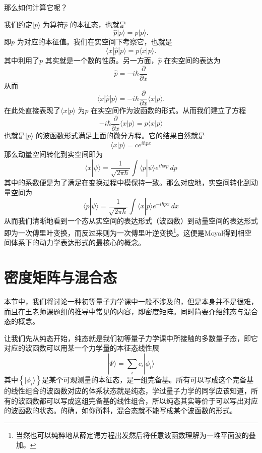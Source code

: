 \documentclass[12pt,a4paper,openany,twoside]{book}
\numberwithin{equation}{section}
\begin{document}
  那么如何计算它呢？

我们约定$| p \rangle $ 为算符$\hat{p}$ 的本征态，也就是
\[
\hat{p} | p \rangle = p | p \rangle 
.\] 
即$p$ 为对应的本征值。我们在实空间下考察它，也就是
\[
\langle x | \hat{p} | p \rangle = p \langle x | p \rangle 
.\] 
其中利用了$p$ 其实就是一个数的性质。另一方面，$\hat{p}$ 在实空间的表达为
\begin{equation}
	\hat{p} = - i \hbar \frac{\partial }{\partial x} 
\end{equation}
从而
\[
\langle x | \hat{p} | p \rangle = - i\hbar \frac{\partial }{\partial x} \langle x | p \rangle 
.\] 
在此处直接表现了$\langle x | p \rangle$ 为$p$ 在实空间作为波函数的形式。从而我们建立了方程
 \begin{equation}
	-i\hbar \frac{\partial }{\partial x} \langle x | p \rangle = p \langle x | p \rangle 
\end{equation} 
也就是$| p \rangle $ 的波函数形式满足上面的微分方程。它的结果自然就是
\begin{equation}
	\langle x | p \rangle = c e^{i\hbar p x}
\end{equation}
那么动量空间转化到实空间即为
\begin{equation}
	\langle x | \psi \rangle  = \frac{1}{\sqrt{2\pi \hbar}}\int \langle p | \psi \rangle e^{i\hbar x p} \, dp 
\end{equation}
其中的系数便是为了满足在变换过程中模保持一致。那么对应地，实空间转化到动量空间为
\begin{equation}
	\langle p | \psi \rangle = \frac{1}{\sqrt{2\pi \hbar}} \int \langle x | p \rangle e^{-i\hbar p x} \, dx 
\end{equation}
从而我们清晰地看到一个态从实空间的表达形式（波函数）到动量空间的表达形式即为一次傅里叶变换，而反过来则为一次傅里叶逆变换\footnote{ 当然也可以纯粹地从薛定谔方程出发然后将任意波函数理解为一堆平面波的叠加。}。这便是Moyal得到相空间体系下的动力学表达形式的最核心的概念。

  \section{密度矩阵与混合态}
  \label{Density Matrix}
  本节中，我们将讨论一种初等量子力学课中一般不涉及的，但是本身并不是很难，而且在王老师课题组的推导中常见的内容，即密度矩阵。同时简要介绍纯态与混合态的概念。

  让我们先从纯态开始，纯态就是我们初等量子力学课中所接触的多数量子态，即它对应的波函数可以用某一个力学量的本征态线性展
  \begin{equation}
    | \Psi \rangle =\sum_i c_{i} | \phi_i \rangle
  \end{equation}
  其中$\left\{ | \phi_i \rangle \right\}$是某个可观测量的本征态，是一组完备基。所有可以写成这个完备基的线性组合的波函数对应的体系状态就是纯态，学过量子力学的同学应该知道，所有的波函数都可以写成这组完备基的线性组合，所以纯态其实等价于可以写出对应的波函数的状态。的确，如你所料，混合态就不能写成某个波函数的形式。
\end{document}

